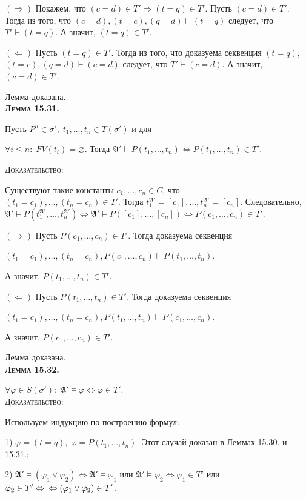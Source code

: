 \documentclass[18pt, a4paper]{extarticle}
\newcommand{\vp}{\varphi}
\newcommand{\vd}{\vdash}
\newcommand{\vD}{\vDash}
\newcommand{\mA}{\mathfrak{A}}
\newcommand{\dok}{\textsc{Доказательство:}}
\begin{document}
$\boxed{(\Rightarrow)}$ Покажем, что $(c=d)\in T' \Rightarrow (t=q)\in T'$. Пусть $(c=d)\in T'$. Тогда из того, что $(c=d), (t=c), (q=d) \vd (t=q)$ следует, что $T'\vd (t=q)$. А значит, $(t=q)\in T'$.

$\boxed{(\Leftarrow)}$ Пусть $(t=q)\in T'$. Тогда из того, что доказуема секвенция $(t=q)$, $(t=c), (q=d)\vd (c=d)$ следует, что $T'\vd (c=d)$. А значит, $(c=d)\in T'$.

Лемма доказана.\\

\textbf{\textsc{Лемма 15.31.}} 

Пусть $P^n\in\sigma',\;t_1,\dots,t_n\in T(\sigma')$ и для

$\forall i\leqslant n:\;FV(t_i)=\varnothing$. Тогда $\mA'\vD P(t_1,\dots,t_n)\Leftrightarrow P(t_1,\dots,t_n)\in T'$.

\dok

Существуют такие константы $c_1,\ldots,c_n\in C$, что\\ $(t_1=c_1),\ldots,(t_n = c_n)\in T'$. Тогда $t_1^{\mA'} = [c_1],\ldots,t_n^{\mA'} = [c_n]$. Следовательно, $\mA'\vD P(t_1^{\mA'},\ldots,t_n^{\mA'}) \Leftrightarrow \mA'\vD P([c_1],\ldots,[c_n])\Leftrightarrow P(c_1,\ldots,c_n)\in T'$.

$\boxed{(\Rightarrow)}$ Пусть $P(c_1,\ldots,c_n)\in T'$.
Тогда доказуема секвенция 

$(t_1 = c_1),\ldots,(t_n = c_n),P(c_1,\ldots,c_n)\vd P(t_1,\ldots,t_n)$.

А значит, $P(t_1,\ldots,t_n)\in T'$.

$\boxed{(\Leftarrow)}$ Пусть $P(t_1,\ldots,t_n)\in T'$. Тогда доказуема секвенция 

$(t_1 = c_1),\ldots,(t_n = c_n),P(t_1,\ldots,t_n)\vd P(c_1,\ldots,c_n)$.

А значит, $P(c_1,\ldots,c_n)\in T'$.

Лемма доказана.\\

\textbf{\textsc{Лемма 15.32.}} 

$\forall\varphi\in S(\sigma'):\;\mathfrak{A}'\vDash\vp\Leftrightarrow\vp\in T'$.\\

\dok

Используем индукцию по построению формул:

1) $\vp=(t=q),\;\vp=P(t_1,\dots,t_n)$. Этот случай доказан в Леммах 15.30. и 15.31.;

2) $\mA'\vD(\vp_1\vee\vp_2)\Leftrightarrow\mA'\vD\vp_1$ или $\mA'\vD\vp_2\Leftrightarrow\vp_1\in T'$ или $\vp_2\in T'\Leftrightarrow\newline\Leftrightarrow(\vp_1\vee\vp_2)\in T'$.
\end{document}
